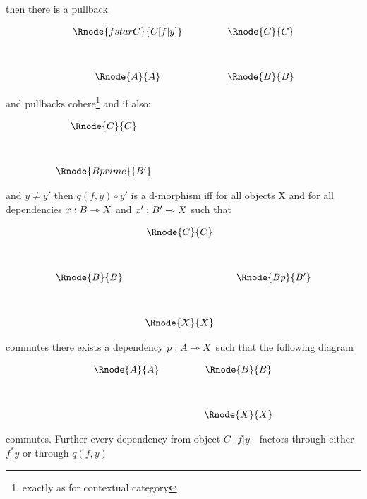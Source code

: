 \documentclass[10pt,a4paper]{scrartcl}
\begin{document}
\begin{enumerate} [(i)]
then there is a pullback 
\vspace{3mm}
\begin{center}
\begin{displaymath}
\begin{array}{cp{.9cm}c}
\Rnode{fstarC}{C[f|y]} & & \Rnode{C}{C}\\ [1.2cm]
\Rnode{A}{A}         & & \Rnode{B}{B}
\end{array}
\end{displaymath}
\end{center}
and pullbacks cohere\footnote{exactly as for contextual category}
and if also:
\begin{center}
$
\begin{array}{cp{.9cm}c}
            & & \Rnode{C}{C} \\ [1.2cm]
& & \Rnode{Bprime}{B'} \\
\end{array}
$
\end{center}
and $y \neq y'$ then $q(f,y) \circ y'$ is a d-morphism iff for all objects X and for all dependencies $x:B \rightarrowtriangle X$ and 
$x':B' \rightarrowtriangle X$ such that
\begin{center}
\begin{displaymath}
\begin{array}{cp{0.1cm}cp{0.1cm}c}   
  & & \Rnode{C}{C} \\    [1.2cm] 
 \Rnode{B}{B} & & &&\Rnode{Bp}{B'}\\ [1.2cm]
  & & \Rnode{X}{X} \\
\end{array}
\end{displaymath}
\end{center}
commutes there exists a dependency $p:A \rightarrowtriangle X$ such that the following diagram 
\begin{center}
\begin{displaymath}
\begin{array}{cp{.9cm}c}
          
\Rnode{A}{A}& & \Rnode{B}{B} \\ [1.2cm]
  & & \Rnode{X}{X} \\
\end{array}
\end{displaymath}
\end{center}
commutes. Further every dependency from object $C[f|y]$ factors through either $f^*y$ or through $q(f,y)$
  

\end{enumerate}
\end{document}
